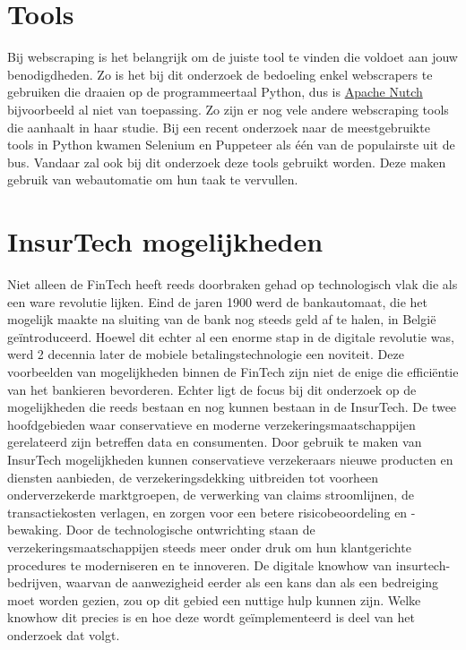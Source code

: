 \section{Tools}

Bij webscraping is het belangrijk om de juiste tool te vinden die voldoet aan jouw benodigdheden.
Zo is het bij dit onderzoek de bedoeling enkel webscrapers te gebruiken die draaien op de programmeertaal Python, dus is \href{https://nutch.apache.org}{Apache Nutch} bijvoorbeeld al niet van toepassing. Zo zijn er nog vele andere webscraping tools die \textcite{Sirisuriya2015} aanhaalt in haar studie.
Bij een recent onderzoek naar de meestgebruikte tools in Python kwamen Selenium en Puppeteer als één van de populairste uit de bus. \autocite{Saurkar2018}
Vandaar zal ook bij dit onderzoek deze tools gebruikt worden. Deze maken gebruik van webautomatie om hun taak te vervullen.

\section{InsurTech mogelijkheden}

Niet alleen de FinTech heeft reeds doorbraken gehad op technologisch vlak die als een ware revolutie lijken. Eind de jaren 1900 werd de bankautomaat, die het mogelijk maakte na sluiting van de bank nog steeds geld af te halen, in België geïntroduceerd. Hoewel dit echter al een enorme stap in de digitale revolutie was, werd 2 decennia later de mobiele betalingstechnologie een noviteit. \autocite{agarwal2020real} Deze voorbeelden van mogelijkheden binnen de FinTech zijn niet de enige die efficiëntie van het bankieren bevorderen. Echter ligt de focus bij dit onderzoek op de mogelijkheden die reeds bestaan en nog kunnen bestaan in de InsurTech. De twee hoofdgebieden waar conservatieve en moderne verzekeringsmaatschappijen gerelateerd zijn betreffen data en consumenten. Door gebruik te maken van InsurTech mogelijkheden kunnen conservatieve verzekeraars nieuwe producten en diensten aanbieden, de verzekeringsdekking uitbreiden tot voorheen onderverzekerde marktgroepen, de verwerking van claims stroomlijnen, de transactiekosten verlagen, en zorgen voor een betere risicobeoordeling en -bewaking. Door de technologische ontwrichting staan de verzekeringsmaatschappijen steeds meer onder druk om hun klantgerichte procedures te moderniseren en te innoveren. De digitale knowhow van insurtech-bedrijven, waarvan de aanwezigheid eerder als een kans dan als een bedreiging moet worden gezien, zou op dit gebied een nuttige hulp kunnen zijn. Welke knowhow dit precies is en hoe deze wordt geïmplementeerd is deel van het onderzoek dat volgt. \autocite{koprivica2018insurtech}
